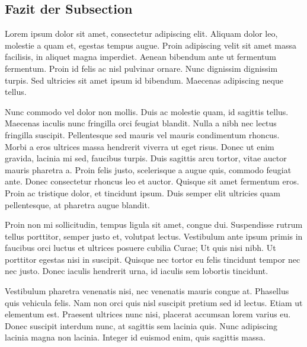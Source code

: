 \subsection{Fazit der Subsection}
Lorem ipsum dolor sit amet, consectetur adipiscing elit. Aliquam dolor leo, molestie a quam et, egestas tempus augue. Proin adipiscing velit sit amet massa facilisis, in aliquet magna imperdiet. Aenean bibendum ante ut fermentum fermentum. Proin id felis ac nisl pulvinar ornare. Nunc dignissim dignissim turpis. Sed ultricies sit amet ipsum id bibendum. Maecenas adipiscing neque tellus.


Nunc commodo vel dolor non mollis. Duis ac molestie quam, id sagittis tellus. Maecenas iaculis nunc fringilla orci feugiat blandit. Nulla a nibh nec lectus fringilla suscipit. Pellentesque sed mauris vel mauris condimentum rhoncus. Morbi a eros ultrices massa hendrerit viverra ut eget risus. Donec ut enim gravida, lacinia mi sed, faucibus turpis. Duis sagittis arcu tortor, vitae auctor mauris pharetra a. Proin felis justo, scelerisque a augue quis, commodo feugiat ante. Donec consectetur rhoncus leo et auctor. Quisque sit amet fermentum eros. Proin ac tristique dolor, et tincidunt ipsum. Duis semper elit ultricies quam pellentesque, at pharetra augue blandit. \cite{Martin:2008:CCH:1388398}

Proin non mi sollicitudin, tempus ligula sit amet, congue dui. Suspendisse rutrum tellus porttitor, semper justo et, volutpat lectus. Vestibulum ante ipsum primis in faucibus orci luctus et ultrices posuere cubilia Curae; Ut quis nisi nibh. Ut porttitor egestas nisi in suscipit. Quisque nec tortor eu felis tincidunt tempor nec nec justo. Donec iaculis hendrerit urna, id iaculis sem lobortis tincidunt.



Vestibulum pharetra venenatis nisi, nec venenatis mauris congue at. Phasellus quis vehicula felis. Nam non orci quis nisl suscipit pretium sed id lectus. Etiam ut elementum est. Praesent ultrices nunc nisi, placerat accumsan lorem varius eu. Donec suscipit interdum nunc, at sagittis sem lacinia quis. Nunc adipiscing lacinia magna non lacinia. Integer id euismod enim, quis sagittis massa.



